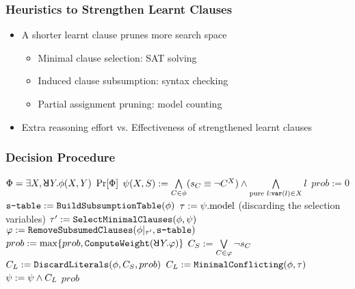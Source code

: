 \begin{frame}
    \frametitle{Heuristics to Strengthen Learnt Clauses}
    \begin{itemize}
        \item A shorter learnt clause prunes more search space
              \begin{itemize}
                  \item Minimal clause selection: SAT solving
                  \item Induced clause subsumption: syntax checking
                  \item Partial assignment pruning: model counting
              \end{itemize}
              \pause
        \item Extra reasoning effort vs. Effectiveness of strengthened learnt clauses
    \end{itemize}
\end{frame}

\begin{frame}
    \frametitle{Decision Procedure}
    {\scriptsize
        \begin{algorithmic}[1]
            \REQUIRE $\Qf=\exists X,\random{} Y.\pf(X,Y)$
            \ENSURE $\Pr[\Phi]$
            \STATE $\psi(X,S) := \bigwedge\limits_{C\in\phi}(s_{C}\equiv\lnot C^X)\land\bigwedge\limits_{\text{pure }l: \texttt{var}(l)\in X}l$\label{code:erssat-init-select}
            \STATE $prob := 0$
            \STATE $\texttt{s-table} := \texttt{BuildSubsumptionTable}(\phi)$\label{code:erssat-subsume-table}
            \WHILE{($\sat{\select}$)}
            \STATE $\tau := \psi.\mathrm{model}$ (discarding the selection variables)
            \IF{($\sat{\pcf{\pf}{\as}}$)}
            \STATE $\tau' := \texttt{SelectMinimalClauses}(\phi,\psi)$\label{code:erssat-minimal-clauses}
            \STATE $\varphi := \texttt{RemoveSubsumedClauses}(\phi|_{\tau'},\texttt{s-table})$\label{code:erssat-subsume-clauses}
            \STATE $prob := \max\{prob,\texttt{ComputeWeight}(\random{} Y.\varphi)\}$\label{code:erssat-wmc}
            \STATE $C_S := \bigvee\limits_{C\in\varphi}\lnot s_{C}$
            \STATE $C_L := \texttt{DiscardLiterals}(\phi,C_S,prob)$\label{code:erssat-discard-literals}
            \ELSE
            \STATE $C_L := \texttt{MinimalConflicting}(\phi,\tau)$
            \ENDIF
            \STATE $\psi := \psi \land C_L$
            \ENDWHILE
            \RETURN $prob$
        \end{algorithmic}
    }
\end{frame}